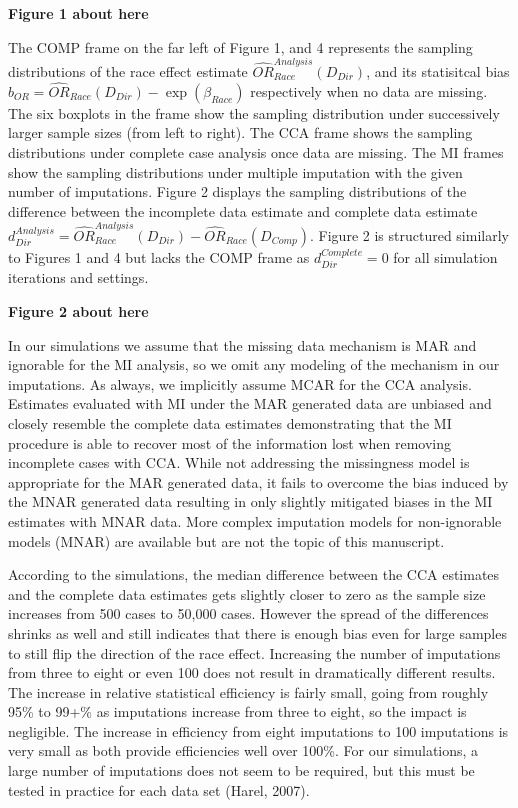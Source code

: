 \documentclass[titlepage]{article}
\begin{document}
\begin{center}
    \textbf{Figure 1 about here}
\end{center}

The COMP frame on the far left of Figure 1, and 4 represents the sampling distributions of the race effect estimate \(\hat{OR}_{Race}^{Analysis}(D_{Dir})\), and its statisitcal bias \(b_{OR} = \hat{OR}_{Race}(D_{Dir}) - \exp(\beta_{Race})\) respectively when no data are missing. The six boxplots in the frame show the sampling distribution under successively larger sample sizes (from left to right). The CCA frame shows the sampling distributions under complete case analysis once data are missing. The MI frames show the sampling distributions under multiple imputation with the given number of imputations. Figure 2 displays the sampling distributions of the difference between the incomplete data estimate and complete data estimate  \(d_{Dir}^{Analysis} = \hat{OR}_{Race}^{Analysis}(D_{Dir}) - \hat{OR}_{Race}(D_{Comp})\). Figure 2 is structured similarly to Figures 1 and 4 but lacks the COMP frame as \(d^{Complete}_{Dir} = 0\) for all simulation iterations and settings.

\begin{center}
    \textbf{Figure 2 about here}
\end{center}

In our simulations we assume that the missing data mechanism is MAR and ignorable for the MI analysis, so we omit any modeling of the mechanism in our imputations. As always, we implicitly assume MCAR for the CCA analysis. Estimates evaluated with MI under the MAR generated data are unbiased and closely resemble the complete data estimates demonstrating that the MI procedure is able to recover most of the information lost when removing incomplete cases with CCA. While not addressing the missingness model is appropriate for the MAR generated data, it fails to overcome the bias induced by the MNAR generated data resulting in only slightly mitigated biases in the MI estimates with MNAR data. More complex imputation models for non-ignorable models (MNAR) are available but are not the topic of this manuscript.

According to the simulations, the median difference between the CCA estimates and the complete data estimates gets slightly closer to zero as the sample size increases from 500 cases to 50,000 cases. However the spread of the differences shrinks as well and still indicates that there is enough bias even for large samples to still flip the direction of the race effect. Increasing the number of imputations from three to eight or even 100 does not result in dramatically different results. The increase in relative statistical efficiency is fairly small, going from roughly 95\% to 99+\% as imputations increase from three to eight, so the impact is negligible. The increase in efficiency from eight imputations to 100 imputations is very small as both provide efficiencies well over 100\%. For our simulations, a large number of imputations does not seem to be required, but this must be tested in practice for each data set (Harel, 2007).
\end{document}
